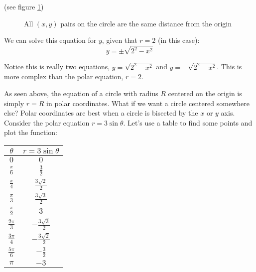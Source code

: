 (see figure \ref{fig:circle2})

\begin{figure}[htbp]
\centering
    \label{fig:circle2}
    \caption{All $(x,y)$ pairs on the circle are the same distance from the origin}
    \end{figure}
    
We can solve this equation for $y$, given that $r = 2$ (in this case):
$$y = \pm \sqrt{2^2 - x^2}$$

Notice this is really two equations, $y = \sqrt{2^2 - x^2}$ and $y = -\sqrt{
2^2 - x^2}$. This is more complex than the polar equation, $r = 2$. 

As seen above, the equation of a circle with radius $R$ centered on the origin 
is simply $r = R$ in polar coordinates. What if we want a circle centered 
somewhere else? Polar coordinates are best when a circle is bisected by the 
$x$ or $y$ axis. Consider the polar equation $r = 3 \sin{\theta}$. Let's use a 
table to find some points and plot the function:

\begin{center}
\begin{tabular}{|c|c|}\hline
$\theta$ & $r = 3 \sin{\theta}$\\\hline
$0$ & $0$\\\hline
$\frac{\pi}{6}$ & $\frac{3}{2}$\\\hline
$\frac{\pi}{4}$ & $\frac{3\sqrt{2}}{2}$\\\hline
$\frac{\pi}{3}$ & $\frac{3\sqrt{3}}{2}$\\\hline
$\frac{\pi}{2}$ & $3$\\\hline
$\frac{2\pi}{3}$ & $-\frac{3\sqrt{3}}{2}$\\\hline
$\frac{3\pi}{4}$ & $-\frac{3\sqrt{2}}{2}$\\\hline
$\frac{5\pi}{6}$ & $-\frac{3}{2}$\\\hline
$\pi$ & $-3$\\\hline
\end{tabular}
\end{center}


